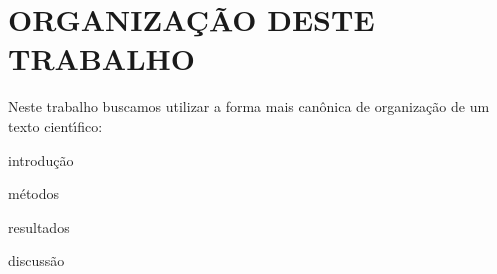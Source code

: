 \documentclass[
12pt,		%
openright,	%
twoside,  %
a4paper,			%
chapter=TITLE,		%
english,			%
french,				%
spanish,			%
brazil				%
]{USPSC-classe/USPSC}
\begin{document}







%


\listoffigures*
\cleardoublepage

\listoftables*
\cleardoublepage

\listofquadro*
\cleardoublepage




\tableofcontents*
\cleardoublepage
\textual

\chapter[ORGANIZA\c{C}\~AO DESTE TRABALHO]{ORGANIZA\c{C}\~AO DESTE TRABALHO}\label{ORGANIZA\c{C}\~AO DESTE TRABALHO}
Neste trabalho buscamos utilizar a forma mais can\^onica de organiza\c{c}\~ao de um texto cient\'{\i}fico:



\begin{alineas}
\item introdu\c{c}\~ao
\item m\'etodos
\item resultados
\item discuss\~ao
\end{alineas}
\end{document}

